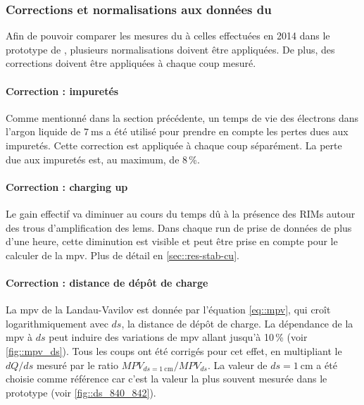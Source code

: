       \subsubsection{Corrections et normalisations aux données du \threeL{}}
        
        Afin de pouvoir comparer les mesures du \TOO{} à celles effectuées en 2014 dans le prototype de \threeL{}, plusieurs normalisations doivent être appliquées. De plus, des corrections doivent être appliquées à chaque coup mesuré.

        \paragraph{Correction : impuretés} Comme mentionné dans la section précédente, un temps de vie des électrons dans l'argon liquide de $\SI{7}{\milli\second}$ a été utilisé pour prendre en compte les pertes dues aux impuretés. Cette correction est appliquée à chaque coup séparément. La perte due aux impuretés est, au maximum, de 8\,\%.

        \paragraph{Correction : charging up} Le gain effectif va diminuer au cours du temps dû à la présence des RIMs autour des trous d'amplification des \glspl{lem}. Dans chaque run de prise de données de plus d'une heure, cette diminution est visible et peut être prise en compte pour le calculer de la \gls{mpv}. Plus de détail en \autoref{sec::res-stab-cu}.

        \paragraph{Correction : distance de dépôt de charge} La \gls{mpv} de la Landau-Vavilov est donnée par l'équation \eqref{eq::mpv}, qui croît logarithmiquement avec $ds$, la distance de dépôt de charge. La dépendance de la \gls{mpv} à $ds$ peut induire des variations de \gls{mpv} allant jusqu'à 10\,\% (voir \autoref{fig::mpv_ds}). Tous les coups ont été corrigés pour cet effet, en multipliant le $dQ/ds$ mesuré par le ratio $MPV_{ds=\SI{1}{\centi\meter}}/MPV_{ds}$. La valeur de $ds=\SI{1}{\centi\meter}$ a été choisie comme référence car c'est la valeur la plus souvent mesurée dans le prototype (voir \autoref{fig::ds_840_842}).

